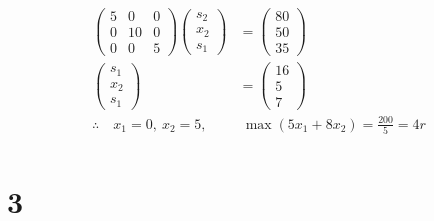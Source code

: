 \documentclass[a4paper,12pt]{article}
\begin{document}
\begin{align*}
    \begin{pmatrix}5 & 0 & 0 \\ 0 & 10 & 0 \\ 0 & 0 & 5\end{pmatrix} \begin{pmatrix}s_2 \\ x_2 \\ s_1\end{pmatrix} & = \begin{pmatrix}80 \\ 50 \\ 35\end{pmatrix} \\
    \begin{pmatrix}s_1 \\x_2 \\ s_1\end{pmatrix}                                                                   & = \begin{pmatrix}16 \\ 5 \\ 7\end{pmatrix}   \\
    \therefore \quad x_1 = 0, \ x_2 = 5,                                                                           & \ \max{(5 x_1 + 8 x_2)} = \frac{200}{5} = 4r \\
\end{align*}

\section*{3}
\end{document}
